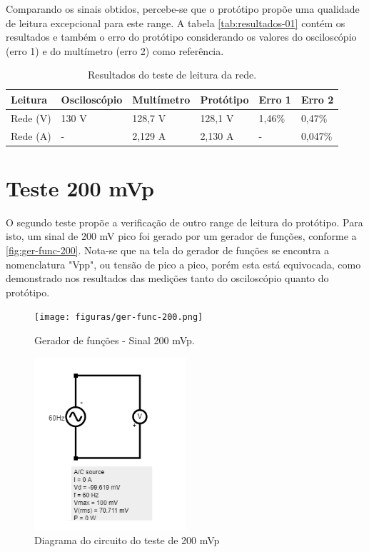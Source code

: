 Comparando os sinais obtidos, percebe-se que o protótipo propõe uma qualidade de leitura excepcional para este range. A tabela \autoref{tab:resultados-01} contém os resultados e também o erro do protótipo considerando os valores do osciloscópio (erro 1) e do multímetro (erro 2) como referência.

\begin{table}[!ht]
    \centering
    \caption{Resultados do teste de leitura da rede.}
    \label{tab:resultados-01}
    \begin{tabular}{|l|l|l|l|l|l|}
        \hline
        \textbf{Leitura} & \textbf{Osciloscópio} & \textbf{Multímetro} & \textbf{Protótipo}  & \textbf{Erro 1}  & \textbf{Erro 2}  \\ \hline
        Rede (V)         & 130 V                 & 128,7 V             & 128,1 V             & 1,46\%           & 0,47\%           \\ \hline
        Rede (A)         & -                     & 2,129 A             & 2,130 A             & -                & 0,047\%          \\ \hline
    \end{tabular}
\end{table}



\section{Teste 200 mVp}\label{teste-200mv}

O segundo teste propõe a verificação de outro range de leitura do protótipo. Para isto, um sinal de 200 mV pico foi gerado por um gerador de funções, conforme a \autoref{fig:ger-func-200}. Nota-se que na tela do gerador de funções se encontra a nomenclatura "Vpp", ou tensão de pico a pico, porém esta está equivocada, como demonstrado nos resultados das medições tanto do osciloscópio quanto do protótipo.

\begin{figure}[htb!]
    \caption{Gerador de funções - Sinal 200 mVp.}
    \label{fig:ger-func-200}
    \texttt{[image: figuras/ger-func-200.png]}
    \fonte{}
\end{figure}

\begin{figure}[htb!]
    \caption{Diagrama do circuito do teste de 200 mVp}
    \label{fig:circ-200}
    \includegraphics[width=0.5\textwidth]{figuras/circ-200-falstad.png}
    \fonte{}
\end{figure}

